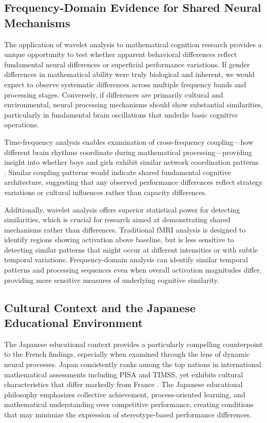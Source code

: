 \documentclass[pdflatex,sn-nature]{sn-jnl}%
\theoremstyle{thmstyleone}%
\theoremstyle{thmstyletwo}%
\theoremstyle{thmstylethree}%
\begin{document}
\subsection{Frequency-Domain Evidence for Shared Neural Mechanisms}
The application of wavelet analysis to mathematical cognition research provides a unique opportunity to test whether apparent behavioral differences reflect fundamental neural differences or superficial performance variations. If gender differences in mathematical ability were truly biological and inherent, we would expect to observe systematic differences across multiple frequency bands and processing stages. Conversely, if differences are primarily cultural and environmental, neural processing mechanisms should show substantial similarities, particularly in fundamental brain oscillations that underlie basic cognitive operations.

Time-frequency analysis enables examination of cross-frequency coupling—how different brain rhythms coordinate during mathematical processing—providing insight into whether boys and girls exhibit similar network coordination patterns \cite{canolty2006high,varela2001brainweb}. Similar coupling patterns would indicate shared fundamental cognitive architecture, suggesting that any observed performance differences reflect strategy variations or cultural influences rather than capacity differences.

Additionally, wavelet analysis offers superior statistical power for detecting similarities, which is crucial for research aimed at demonstrating shared mechanisms rather than differences. Traditional fMRI analysis is designed to identify regions showing activation above baseline, but is less sensitive to detecting similar patterns that might occur at different intensities or with subtle temporal variations. Frequency-domain analysis can identify similar temporal patterns and processing sequences even when overall activation magnitudes differ, providing more sensitive measures of underlying cognitive similarity.


\subsection{Cultural Context and the Japanese Educational Environment}
The Japanese educational context provides a particularly compelling counterpoint to the French findings, especially when examined through the lens of dynamic neural processes. Japan consistently ranks among the top nations in international mathematical assessments including PISA and TIMSS, yet exhibits cultural characteristics that differ markedly from France \cite{mullis2020timss}. The Japanese educational philosophy emphasizes collective achievement, process-oriented learning, and mathematical understanding over competitive performance, creating conditions that may minimize the expression of stereotype-based performance differences.
\end{document}

